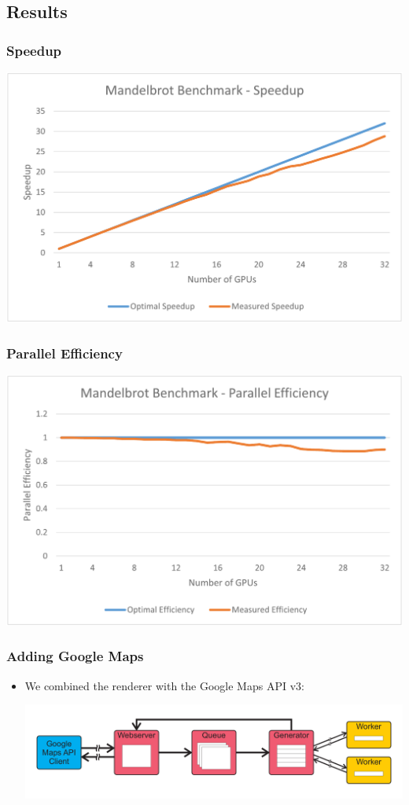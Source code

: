 \documentclass{beamer}
\begin{document}
\subsection{Results}
\begin{frame}
    \frametitle{Speedup}
    \begin{center}
        \includegraphics[width=.9\textwidth]{../2014-09-25_gputalk/Mandelbrot_bench_stampede.pdf}
    \end{center}
\end{frame}

\begin{frame}
    \frametitle{Parallel Efficiency}
    \begin{center}
        \includegraphics[width=.9\textwidth]{../2014-09-25_gputalk/Mandelbrot_bench_stampede_2.pdf}
    \end{center}
\end{frame}

\begin{frame}
    \frametitle{Adding Google Maps}
    \begin{itemize}
        \item We combined the renderer with the Google Maps API v3:
        \begin{center}
            \includegraphics[width=.9\textwidth]{../2014-09-25_gputalk/mandelbrot_pipeline.pdf}
        \end{center}
    \end{itemize}
\end{frame}
\end{document}
